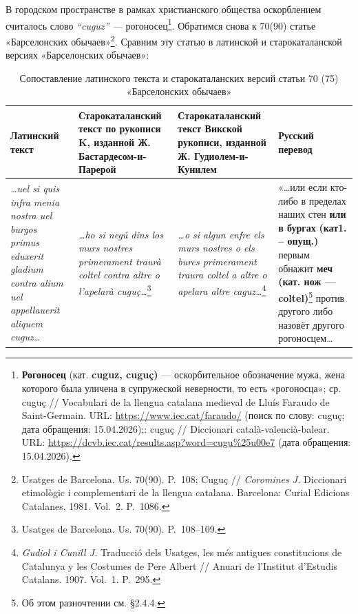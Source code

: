 В городском пространстве в рамках христианского общества оскорблением считалось слово\emph{ “}\emph{cuguz}\emph{” --- }рогоносец\footnote{\textbf{Рогоносец}\textbf{ }(кат. \textbf{c}\textbf{uguz, cuguç)} --- оскорбительное обозначение мужа, жена которого была уличена в супружеской неверности, то есть «рогоносца»; ср. cuguç // Vocabulari de la llengua catalana medieval de Lluís Faraudo de Saint-Germain.  URL: \url{https://www.iec.cat/faraudo/} (поиск по слову: cuguç; дата обращения: 15.04.2026);: cuguç // Diccionari català-valencià-balear.  URL: \url{https://dcvb.iec.cat/results.asp?word=cugu\%25u00e7} (дата обращения: 15.04.2026).}. Обратимся снова к 70(90) статье «Барселонских обычаев»\footnote{Usatges de Barcelona. Us. 70(90). P.~108; Cuguç // \emph{Coromines J. }Diccionari etimològic i complementari de la llengua catalana. Barcelona: Curial Edicions Catalanes, 1981. Vol.~2. P.~1086.}\emph{.} Сравним эту статью в латинской и старокаталанской версиях «Барселонских обычаев»:

\begin{center}
\small
\setlength{\tabcolsep}{2pt}
\begin{longtable}{|p{}|p{}|p{}|p{}|}
\caption{Сопоставление латинского текста и старокаталанских версий статьи 70 (75) «Барселонских обычаев»}\label{tab:ch2-usatge-70}\\
\hline
\textbf{Латинский текст} & \textbf{Старокаталанский текст по рукописи K, изданной Ж. Бастардесом-и-Парерой} & \textbf{Старокаталанский текст Викской рукописи, изданной Ж. Гудиолем-и-Кунилем} & \textbf{Русский перевод} \\ \hline
\emph{…uel si quis infra menia nostra uel burgos primus eduxerit gladium contra alium uel appellauerit aliquem cuguz…} & \emph{…ho si negú dins los murs nostres primerament traurà coltel contra altre o l’apelarà cuguç…}\footnote{Usatges de Barcelona. Us. 70(90). P.~108--109.} & \emph{…o si algun enfre els murs nostres o els burcs primerament traura coltel a altre o apelara altre caguz…}\footnote{\emph{Gudiol i Cunill J. }Traducció dels Usatges, les més antigues constitucions de Catalunya y les Costumes de Pere Albert // Anuari de l’Institut d’Estudis Catalans. 1907. Vol.~1. P.~295.} & «…или если кто-либо в пределах наших стен \textbf{или в бургах}\textbf{ (кат1. -- опущ.)} первым обнажит \textbf{меч (кат. нож --- coltel)}\footnote{Об этом разночтении см. §2.4.4.}\textbf{ }против другого либо назовёт другого рогоносцем… \\ \hline
\end{longtable}
\end{center}

